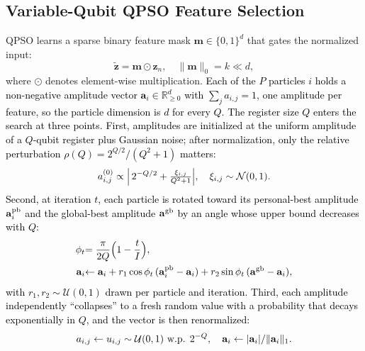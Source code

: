 \documentclass[conference]{IEEEtran}
\begin{document}
\subsection{Variable-Qubit QPSO Feature Selection}
\label{subsec:qpsomethod}

QPSO learns a sparse binary feature mask
$\mathbf{m}\in\{0,1\}^d$ that gates the normalized input:
\begin{equation}
\tilde{\mathbf{z}} = \mathbf{m}\odot\mathbf{z}_n,\quad
\|\mathbf{m}\|_0 = k \ll d,
\label{eq:mask_gate}
\end{equation}
where $\odot$ denotes element-wise multiplication.
\textcolor{black}{Each of the $P$ particles $i$ holds a
non-negative amplitude vector $\mathbf{a}_i\in\mathbb{R}_{\ge 0}^{d}$
with $\sum_j a_{i,j}=1$, one amplitude per feature, so the particle
dimension is $d$ for every $Q$. The register size $Q$ enters the
search at three points. First, amplitudes are initialized at the
uniform amplitude of a $Q$-qubit register plus Gaussian noise; after
normalization, only the relative perturbation
$\rho(Q)=2^{Q/2}/(Q^{2}+1)$ matters:}
\begin{equation}
\textcolor{black}{a_{i,j}^{(0)} \propto \Bigl|\,2^{-Q/2} +
\tfrac{\xi_{i,j}}{Q^{2}+1}\Bigr|,\quad
\xi_{i,j}\sim\mathcal{N}(0,1).}
\label{eq:qpso_init}
\end{equation}
\textcolor{black}{Second, at iteration $t$, each particle is
rotated toward its personal-best amplitude $\mathbf{a}_i^{\rm pb}$
and the global-best amplitude $\mathbf{a}^{\rm gb}$ by an angle whose
upper bound decreases with $Q$:}
\begin{align}
\textcolor{black}{\phi_t} &\textcolor{black}{= \frac{\pi}{2Q}\Bigl(1-\frac{t}{I}\Bigr),}
\label{eq:qpso_angle}\\
\textcolor{black}{\mathbf{a}_i} &\textcolor{black}{\leftarrow \mathbf{a}_i
+ r_1\cos\phi_t\,(\mathbf{a}_i^{\rm pb}-\mathbf{a}_i)
+ r_2\sin\phi_t\,(\mathbf{a}^{\rm gb}-\mathbf{a}_i),}
\label{eq:qpso_rotation}
\end{align}
\textcolor{black}{with $r_1,r_2\sim\mathcal{U}(0,1)$ drawn per
particle and iteration. Third, each amplitude independently
``collapses'' to a fresh random value with a probability that decays
exponentially in $Q$, and the vector is then renormalized:}
\begin{equation}
\textcolor{black}{a_{i,j} \leftarrow u_{i,j}\sim\mathcal{U}(0,1)
\ \text{w.p. } 2^{-Q},\quad
\mathbf{a}_i \leftarrow |\mathbf{a}_i| / \|\mathbf{a}_i\|_1 .}
\label{eq:qpso_collapse}
\end{equation}
\end{document}
